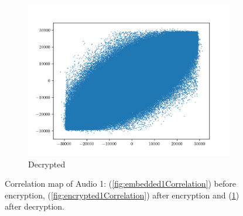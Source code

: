 \documentclass[a4paper]{cas-sc}
\begin{document}
\begin{figure}[pos=h]
\begin{subfigure}[h]{0.3\textwidth}
\begin{center}
        \end{center}
    \end{subfigure}
    \begin{subfigure}[h]{0.3\textwidth}
        \begin{center}
            \includegraphics[width=\textwidth]{decrypted1Correlation.png}
            \caption{Decrypted}
            \label{fig:decrypted1Correlation}
        \end{center}
    \end{subfigure}
    \caption{Correlation map of Audio 1: (\ref{fig:embedded1Correlation}) before encryption, (\ref{fig:encrypted1Correlation}) after encryption and (\ref{fig:decrypted1Correlation}) after decryption.}
    \label{fig:audio1Correlation}
\end{figure}
\end{document}
